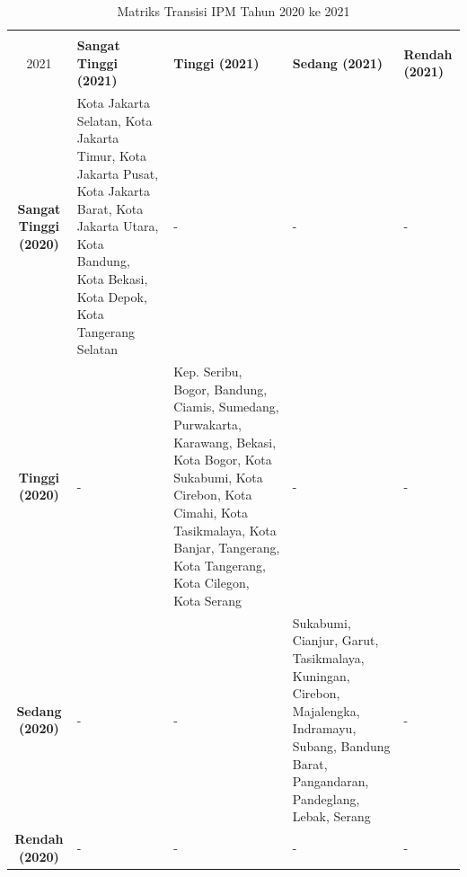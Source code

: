 \begin{table}[H]
\centering
\caption{Matriks Transisi IPM Tahun 2020 ke 2021} \label{tab:ipm_transisi_2020_2021}
\begin{tabular}{|c|p{2cm}|p{2cm}|p{2cm}|p{2cm}|}
\hline
\textbf{Tahun 2020 \\ 2021} & \textbf{Sangat Tinggi (2021)} & \textbf{Tinggi (2021)} & \textbf{Sedang (2021)} & \textbf{Rendah (2021)} \\ \hline
\textbf{Sangat Tinggi (2020)} & Kota Jakarta Selatan, Kota Jakarta Timur, Kota Jakarta Pusat, Kota Jakarta Barat, Kota Jakarta Utara, Kota Bandung, Kota Bekasi, Kota Depok, Kota Tangerang Selatan & - & - & - \\ \hline
\textbf{Tinggi (2020)} & - & Kep. Seribu, Bogor, Bandung, Ciamis, Sumedang, Purwakarta, Karawang, Bekasi, Kota Bogor, Kota Sukabumi, Kota Cirebon, Kota Cimahi, Kota Tasikmalaya, Kota Banjar, Tangerang, Kota Tangerang, Kota Cilegon, Kota Serang & - & - \\ \hline
\textbf{Sedang (2020)} & - & - & Sukabumi, Cianjur, Garut, Tasikmalaya, Kuningan, Cirebon, Majalengka, Indramayu, Subang, Bandung Barat, Pangandaran, Pandeglang, Lebak, Serang & - \\ \hline
\textbf{Rendah (2020)} & - & - & - & - \\ \hline
\end{tabular}
\end{table}